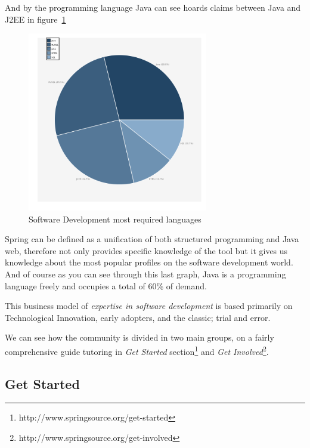 \documentclass[11pt]{scrartcl}
\begin{document}
\par And by the programming language Java can see hoards claims between Java and J2EE in figure~\ref{fig:req-languages}

\begin{figure}[H]
\begin{center}
  \includegraphics[width=0.7\textwidth]{images/requested-programming-language-piechart.png}
  \caption{Software Development most required languages}
  \label{fig:req-languages}
\end{center}
\end{figure}

\par Spring can be defined as a unification of both structured programming and Java web, therefore not only provides specific knowledge of the tool but it gives us knowledge about the most popular profiles on the software development world. And of course as you can see through this last graph, Java is a programming language freely and occupies a total of 60\% of demand.

\par This business model of \emph{expertise in software development} is based primarily on Technological Innovation, early adopters, and the classic; trial and error.

\par We can see how the community is divided in two main groups, on a fairly comprehensive guide tutoring in \emph{Get Started} section\footnote{http://www.springsource.org/get-started} and \emph{Get Involved}\footnote{http://www.springsource.org/get-involved}.

\subsection{Get Started}
\end{document}
